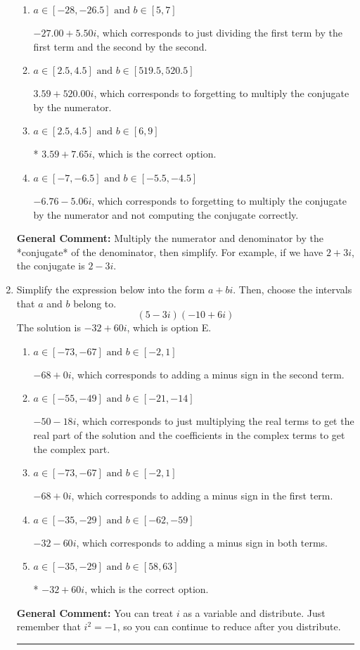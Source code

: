 \documentclass{extbook}[14pt]
\newcommand{\litem}[1]{\item #1

\rule{\textwidth}{0.4pt}}
\begin{document}
\begin{enumerate}
{\begin{enumerate}[label=\Alph*.]
 $244.00  + 7.65 i$, which corresponds to forgetting to multiply the conjugate by the numerator and using a plus instead of a minus in the denominator.
\item \( a \in [-28, -26.5] \text{ and } b \in [5, 7] \)

 $-27.00  + 5.50 i$, which corresponds to just dividing the first term by the first term and the second by the second.
\item \( a \in [2.5, 4.5] \text{ and } b \in [519.5, 520.5] \)

 $3.59  + 520.00 i$, which corresponds to forgetting to multiply the conjugate by the numerator.
\item \( a \in [2.5, 4.5] \text{ and } b \in [6, 9] \)

* $3.59  + 7.65 i$, which is the correct option.
\item \( a \in [-7, -6.5] \text{ and } b \in [-5.5, -4.5] \)

 $-6.76  - 5.06 i$, which corresponds to forgetting to multiply the conjugate by the numerator and not computing the conjugate correctly.
\end{enumerate}

\textbf{General Comment:} Multiply the numerator and denominator by the *conjugate* of the denominator, then simplify. For example, if we have $2+3i$, the conjugate is $2-3i$.
}
\litem{
Simplify the expression below into the form $a+bi$. Then, choose the intervals that $a$ and $b$ belong to.
\[ (5 - 3 i)(-10 + 6 i) \]The solution is \( -32 + 60 i \), which is option E.\begin{enumerate}[label=\Alph*.]
\item \( a \in [-73, -67] \text{ and } b \in [-2, 1] \)

 $-68 + 0 i$, which corresponds to adding a minus sign in the second term.
\item \( a \in [-55, -49] \text{ and } b \in [-21, -14] \)

 $-50 - 18 i$, which corresponds to just multiplying the real terms to get the real part of the solution and the coefficients in the complex terms to get the complex part.
\item \( a \in [-73, -67] \text{ and } b \in [-2, 1] \)

 $-68 + 0 i$, which corresponds to adding a minus sign in the first term.
\item \( a \in [-35, -29] \text{ and } b \in [-62, -59] \)

 $-32 - 60 i$, which corresponds to adding a minus sign in both terms.
\item \( a \in [-35, -29] \text{ and } b \in [58, 63] \)

* $-32 + 60 i$, which is the correct option.
\end{enumerate}

\textbf{General Comment:} You can treat $i$ as a variable and distribute. Just remember that $i^2=-1$, so you can continue to reduce after you distribute.
}
\end{enumerate}
\end{document}
